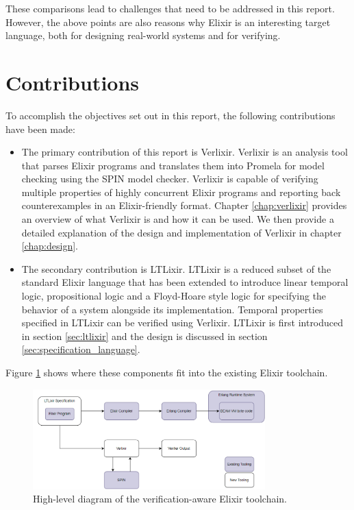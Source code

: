 These comparisons lead to challenges that need to be addressed in this report. However, the above points are also reasons why Elixir is an interesting target language, both for designing real-world systems and for verifying.  
\section{Contributions}
To accomplish the objectives set out in this report, the following contributions have been made:
\begin{itemize}
    \item The primary contribution of this report is Verlixir. Verlixir is an analysis tool that parses Elixir programs and translates them into Promela \cite{promela} for model checking using the SPIN \cite{spin} model checker. Verlixir is capable of verifying multiple properties of highly concurrent Elixir programs and reporting back counterexamples in an Elixir-friendly format. Chapter \ref{chap:verlixir} provides an overview of what Verlixir is and how it can be used. We then provide a detailed explanation of the design and implementation of Verlixir in chapter \ref{chap:design}.
    \item The secondary contribution is LTLixir. LTLixir is a reduced subset of the standard Elixir language that has been extended to introduce linear temporal logic, propositional logic and a Floyd-Hoare style logic for specifying the behavior of a system alongside its implementation. Temporal properties specified in LTLixir can be verified using Verlixir. LTLixir is first introduced in section \ref{sec:ltlixir} and the design is discussed in section \ref{sec:specification_language}.
\end{itemize}
Figure \ref{fig:overview_dig} shows where these components fit into the existing Elixir toolchain.
\begin{figure}[H]
    \centering
    \includegraphics[width=0.8\textwidth]{images/high_level_system.png}
    \caption{High-level diagram of the verification-aware Elixir toolchain.}
    \label{fig:overview_dig}
\end{figure}